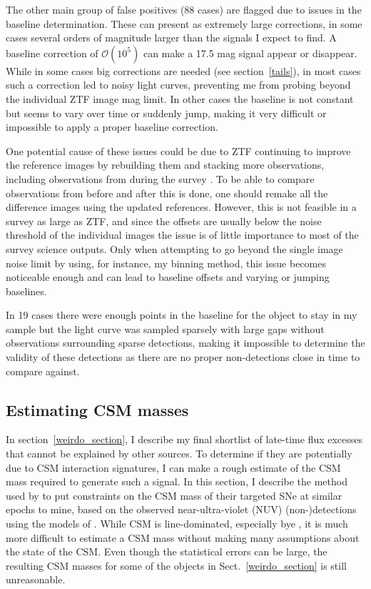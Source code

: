\documentclass[a4paper,oneside,12pt, class=Latex/Classes/PhDthesisPSnPDF, crop=false]{standalone}
\begin{document}
The other main group of false positives (88 cases) are flagged due to issues in the baseline determination. These can present as extremely large corrections, in some cases several orders of magnitude larger than the signals I expect to find. A baseline correction of $\mathcal{O}(10^5)$ can make a 17.5 mag signal appear or disappear. While in some cases big corrections are needed (see section~\ref{tails}), in most cases such a correction led to noisy light curves, preventing me from probing beyond the individual ZTF image mag limit. In other cases the baseline is not constant but seems to vary over time or suddenly jump, making it very difficult or impossible to apply a proper baseline correction.

One potential cause of these issues could be due to ZTF continuing to improve the reference images by rebuilding them and stacking more observations, including observations from during the survey \citep{ZTF_Instrumentation}. To be able to compare observations from before and after this is done, one should remake all the difference images using the updated references. However, this is not feasible in a survey as large as ZTF, and since the offsets are usually below the noise threshold of the individual images the issue is of little importance to most of the survey science outputs. Only when attempting to go beyond the single image noise limit by using, for instance, my binning method, this issue becomes noticeable enough and can lead to baseline offsets and varying or jumping baselines.

In 19 cases there were enough points in the baseline for the object to stay in my sample but the light curve was sampled sparsely with large gaps without observations surrounding sparse detections, making it impossible to determine the validity of these detections as there are no proper non-detections close in time to compare against.


\subsection{Estimating CSM masses}
\label{CSM_calc}
In section~\ref{weirdo_section}, I describe my final shortlist of late-time flux excesses that cannot be explained by other sources. To determine if they are potentially due to CSM interaction signatures, I can make a rough estimate of the CSM mass required to generate such a signal. In this section, I describe the method used by \citet{2015cp} to put constraints on the CSM mass of their targeted SNe at similar epochs to mine, based on the observed near-ultra-violet (NUV) (non-)detections using the models of \citet{CSM_models_Harris}. While CSM is line-dominated, especially bye \Halpha, it is much more difficult to estimate a CSM mass without making many assumptions about the state of the CSM. Even though the statistical errors can be large, the resulting CSM masses for some of the objects in Sect.~\ref{weirdo_section} is still unreasonable.
\end{document}
